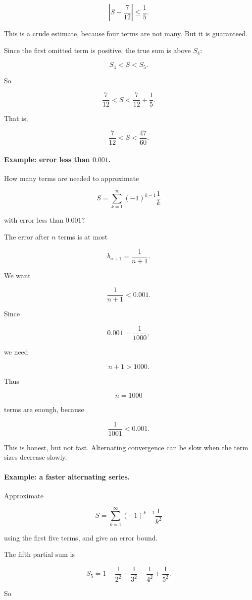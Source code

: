 \[
\left|S-\frac7{12}\right|\le \frac15.
\]

This is a crude estimate, because four terms are not many.  But it is guaranteed.

Since the first omitted term is positive, the true sum is above \(S_4\):

\[
S_4<S<S_5.
\]

So

\[
\frac7{12}<S<\frac7{12}+\frac15.
\]

That is,

\[
\frac7{12}<S<\frac{47}{60}.
\]

\paragraph{Example: error less than \(0.001\).}
How many terms are needed to approximate

\[
S=\sum_{k=1}^{\infty}(-1)^{k-1}\frac1k
\]

with error less than \(0.001\)?

The error after \(n\) terms is at most

\[
b_{n+1}=\frac1{n+1}.
\]

We want

\[
\frac1{n+1}<0.001.
\]

Since

\[
0.001=\frac1{1000},
\]

we need

\[
n+1>1000.
\]

Thus

\[
\boxed{
n=1000
}
\]

terms are enough, because

\[
\frac1{1001}<0.001.
\]

This is honest, but not fast.  Alternating convergence can be slow when the term sizes
decrease slowly.

\paragraph{Example: a faster alternating series.}
Approximate

\[
S=\sum_{k=1}^{\infty}(-1)^{k-1}\frac1{k^2}
\]

using the first five terms, and give an error bound.

The fifth partial sum is

\[
S_5=1-\frac1{2^2}+\frac1{3^2}-\frac1{4^2}+\frac1{5^2}.
\]

So

